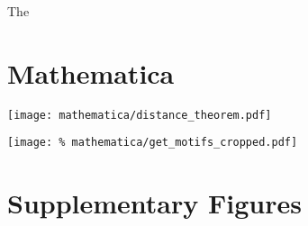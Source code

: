 The


\section{Mathematica}

\vspace{-1cm}
\begin{mathematica}[H]
  \centering
  \captionsetup{format=plain, font=normal, skip=7pt}
  \texttt{[image: mathematica/distance\_theorem.pdf]}
  \caption{\label{mathematica:distances}%
    Computation of probability density function for distance between
    to random points in square of side length $s$ as supplement to
    proof of Theorem~\ref{theorem:distance_square}. Note that form of
    final result \texttt{Out[7]} differs from solution given in
    \ref{theorem:distance_square} for $1<x<\sqrt{2}$. While proof of
    equivalence could not be achieved analytically, expressions given
    are numerically equivalent.}
  
  \vspace{0.7cm}

  \texttt{[image: \%
    mathematica/get\_motifs\_cropped.pdf]}
    \captionsetup{format=plain, font=normal, skip=-6pt}
    \caption{\label{mathematica:motif}%
      Computation of three motifs for
      Section~\ref{sec:motifs}. Function \texttt{c[x]} is the
      distance-dependent probability distribution from Theorem and
      \texttt{w[x]} the probability density function for distance
      between two random points in a box
      (cf. Mathematica~\ref{mathematica:distances}, Moltchanov 2012).}

\end{mathematica} 










\section{Supplementary Figures}\label{sec:supp_figures}

